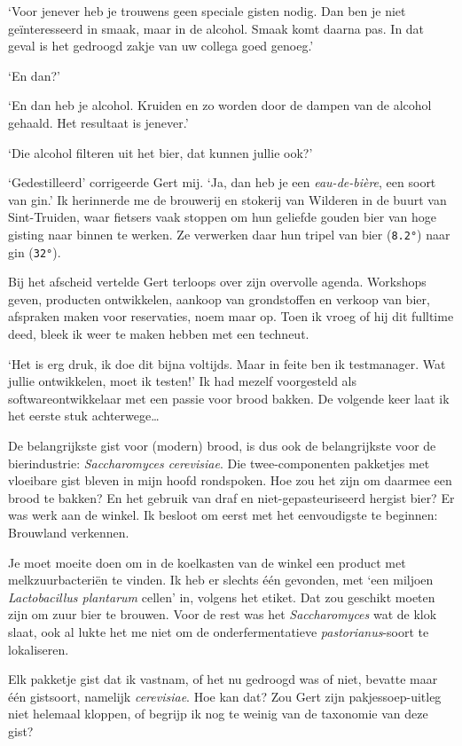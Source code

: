 \documentclass[
  11pt,
  dutch,
]{memoir}
\begin{document}
`Voor jenever heb je trouwens geen speciale gisten nodig. Dan ben je
niet geïnteresseerd in smaak, maar in de alcohol. Smaak komt daarna pas.
In dat geval is het gedroogd zakje van uw collega goed genoeg.'

`En dan?'

`En dan heb je alcohol. Kruiden en zo worden door de dampen van de
alcohol gehaald. Het resultaat is jenever.'

`Die alcohol filteren uit het bier, dat kunnen jullie ook?'

`Gedestilleerd' corrigeerde Gert mij. `Ja, dan heb je een
\emph{eau-de-bière}, een soort van gin.' Ik herinnerde me de brouwerij
en stokerij van Wilderen in de buurt van Sint-Truiden, waar fietsers
vaak stoppen om hun geliefde gouden bier van hoge gisting naar binnen te
werken. Ze verwerken daar hun tripel van bier (\texttt{8.2°}) naar gin
(\texttt{32°}).

Bij het afscheid vertelde Gert terloops over zijn overvolle agenda.
Workshops geven, producten ontwikkelen, aankoop van grondstoffen en
verkoop van bier, afspraken maken voor reservaties, noem maar op. Toen
ik vroeg of hij dit fulltime deed, bleek ik weer te maken hebben met een
techneut.

`Het is erg druk, ik doe dit bijna voltijds. Maar in feite ben ik
testmanager. Wat jullie ontwikkelen, moet ik testen!' Ik had mezelf
voorgesteld als softwareontwikkelaar met een passie voor brood bakken.
De volgende keer laat ik het eerste stuk achterwege\ldots{}

De belangrijkste gist voor (modern) brood, is dus ook de belangrijkste
voor de bierindustrie: \emph{Saccharomyces cerevisiae}. Die
twee-componenten pakketjes met vloeibare gist bleven in mijn hoofd
rondspoken. Hoe zou het zijn om daarmee een brood te bakken? En het
gebruik van draf en niet-gepasteuriseerd hergist bier? Er was werk aan
de winkel. Ik besloot om eerst met het eenvoudigste te beginnen:
Brouwland verkennen.

Je moet moeite doen om in de koelkasten van de winkel een product met
melkzuurbacteriën te vinden. Ik heb er slechts één gevonden, met `een
miljoen \emph{Lactobacillus plantarum} cellen' in, volgens het etiket.
Dat zou geschikt moeten zijn om zuur bier te brouwen. Voor de rest was
het \emph{Saccharomyces} wat de klok slaat, ook al lukte het me niet om
de onderfermentatieve \emph{pastorianus}-soort te lokaliseren.

Elk pakketje gist dat ik vastnam, of het nu gedroogd was of niet,
bevatte maar één gistsoort, namelijk \emph{cerevisiae}. Hoe kan dat? Zou
Gert zijn pakjessoep-uitleg niet helemaal kloppen, of begrijp ik nog te
weinig van de taxonomie van deze gist?
\end{document}
